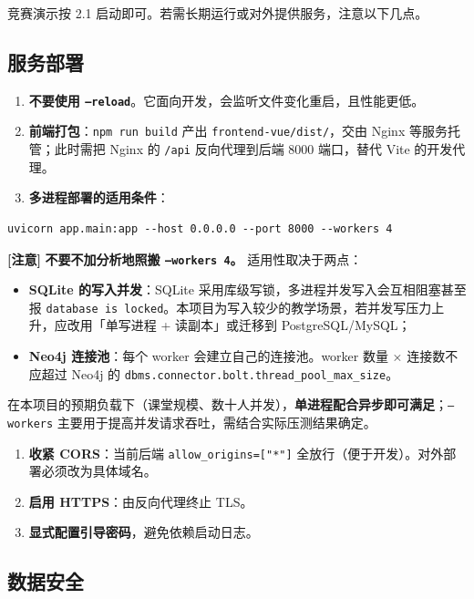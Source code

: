 \documentclass[UTF8,a4paper,11pt]{ctexrep}
\newcommand{\warnmark}{\textcolor{todobar}{\textbf{[注意]}}}
\begin{document}
竞赛演示按 2.1 启动即可。若需长期运行或对外提供服务，注意以下几点。


\subsection{服务部署}

\begin{enumerate}
\item \textbf{不要使用 \texttt{--reload}}。它面向开发，会监听文件变化重启，且性能更低。
\item \textbf{前端打包}：\texttt{npm run build} 产出 \texttt{frontend-vue/dist/}，交由 Nginx 等服务托管；此时需把 Nginx 的 \texttt{/api} 反向代理到后端 8000 端口，替代 Vite 的开发代理。
\item \textbf{多进程部署的适用条件}：
\end{enumerate}
\begin{Verbatim}[breaklines=true,breakanywhere=true,fontsize=\small,frame=single,framesep=4pt,rulecolor=\color{codeframe}]
   uvicorn app.main:app --host 0.0.0.0 --port 8000 --workers 4
\end{Verbatim}

\warnmark{} \textbf{不要不加分析地照搬 \texttt{--workers 4}。} 适用性取决于两点：

\begin{itemize}
\item \textbf{SQLite 的写入并发}：SQLite 采用库级写锁，多进程并发写入会互相阻塞甚至报 \texttt{database is locked}。本项目为写入较少的教学场景，若并发写压力上升，应改用「单写进程 + 读副本」或迁移到 PostgreSQL/MySQL；
\item \textbf{Neo4j 连接池}：每个 worker 会建立自己的连接池。worker 数量 × 连接数不应超过 Neo4j 的 \texttt{dbms.connector.bolt.thread\_pool\_max\_size}。
\end{itemize}
在本项目的预期负载下（课堂规模、数十人并发），\textbf{单进程配合异步即可满足}；\texttt{--workers} 主要用于提高并发请求吞吐，需结合实际压测结果确定。

\begin{enumerate}
\item \textbf{收紧 CORS}：当前后端 \texttt{allow\_origins=["*"]} 全放行（便于开发）。对外部署必须改为具体域名。
\item \textbf{启用 HTTPS}：由反向代理终止 TLS。
\item \textbf{显式配置引导密码}，避免依赖启动日志。
\end{enumerate}

\subsection{数据安全}
\end{document}
